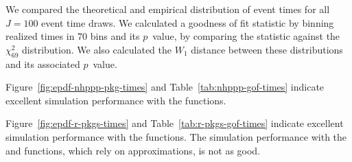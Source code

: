 \documentclass[article,nojss]{jss}\usepackage[]{graphicx}\usepackage[]{xcolor}
\begin{document}
We compared the theoretical and empirical distribution of event times for all $J=100$ event time draws. We calculated a goodness of fit statistic by binning realized times in $70$ bins and its $p$~value, by comparing the statistic against the $\chi^2_{69}$ distribution. We also calculated the $W_1$ distance between these distributions and its associated $p$~value.

Figure~\ref{fig:epdf-nhppp-pkg-times} and Table~\ref{tab:nhppp-gof-times} indicate excellent simulation performance with the  functions.

Figure~\ref{fig:epdf-r-pkgs-times} and Table~\ref{tab:r-pkgs-gof-times} indicate excellent simulation performance with the  functions. The simulation performance with the  and  functions, which rely on approximations, is not as good.







\begin{table}[ht]
\centering
{}
\caption{Goodness of fit of simulated event times with  functions for the example.} 
\label{tab:nhppp-gof-times}
\end{table}
\end{document}
